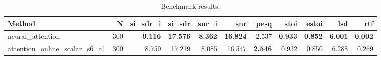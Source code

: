 \begin{table}[t]
\centering
\caption{Benchmark results.}
\label{tab:bench}
\begin{tabular}{lrrrrrrrrrr}
\toprule
Method & N & si\_sdr\_i & si\_sdr & snr\_i & snr & pesq & stoi & estoi & lsd & rtf \\
\midrule
neural_attention & 300 & \textbf{9.116} & \textbf{17.576} & \textbf{8.362} & \textbf{16.824} & 2.537 & \textbf{0.933} & \textbf{0.852} & \textbf{6.001} & \textbf{0.002} \\
attention_online_scalar_s6_a1 & 300 & 8.759 & 17.219 & 8.085 & 16.547 & \textbf{2.546} & 0.932 & 0.850 & 6.288 & 0.269 \\
\bottomrule
\end{tabular}
\end{table}